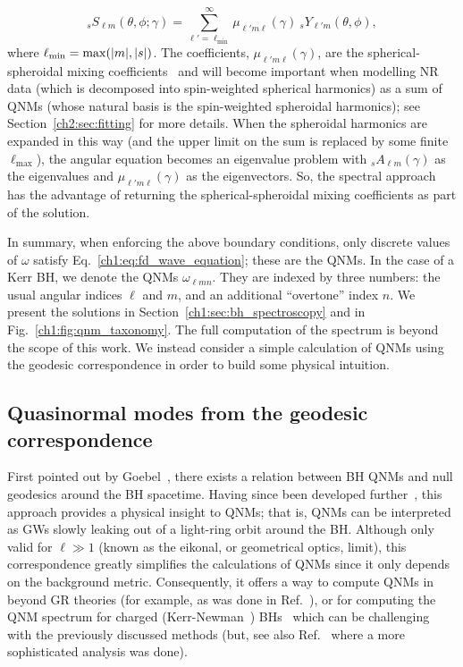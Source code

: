 \begin{equation}
    {}_{s}S_{\ell m}(\theta,\phi;\gamma) = \sum_{\ell'=\ell_\mathrm{min}}^\infty \mu_{\ell'm\ell}(\gamma) ~ {}_{s}Y_{\ell'm}(\theta,\phi),
\end{equation}
where $\ell_\mathrm{min} = \mathrm{max}(\abs{m},\abs{s})$.
The coefficients, $\mu_{\ell'm\ell}(\gamma)$, are the spherical-spheroidal mixing coefficients~\cite{Berti:2014fga} and will become important when modelling NR data (which is decomposed into spin-weighted spherical harmonics) as a sum of QNMs (whose natural basis is the spin-weighted spheroidal harmonics); see Section~\ref{ch2:sec:fitting} for more details.
When the spheroidal harmonics are expanded in this way (and the upper limit on the sum is replaced by some finite $\ell_\mathrm{max}$), the angular equation becomes an eigenvalue problem with ${}_{s}A_{\ell m}(\gamma)$ as the eigenvalues and $\mu_{\ell'm\ell}(\gamma)$ as the eigenvectors.
So, the spectral approach has the advantage of returning the spherical-spheroidal mixing coefficients as part of the solution.

In summary, when enforcing the above boundary conditions, only discrete values of $\omega$ satisfy Eq.~\ref{ch1:eq:fd_wave_equation}; these are the QNMs.
In the case of a Kerr BH, we denote the QNMs $\omega_{\ell m n}$.
They are indexed by three numbers: the usual angular indices $\ell$ and $m$, and an additional ``overtone'' index $n$.
We present the solutions in Section~\ref{ch1:sec:bh_spectroscopy} and in Fig.~\ref{ch1:fig:qnm_taxonomy}.
The full computation of the spectrum is beyond the scope of this work.
We instead consider a simple calculation of QNMs using the geodesic correspondence in order to build some physical intuition.

\subsection{Quasinormal modes from the geodesic correspondence}
\label{ch1:sec:geodesic}

First pointed out by Goebel~\cite{1972ApJ...172L..95G}, there exists a relation between BH QNMs and null geodesics around the BH spacetime.
Having since been developed further~\cite{BLOME1984231, Ferrari:1984ozr, Ferrari:1984zz, Cardoso:2008bp, Yang:2012he}, this approach provides a physical insight to QNMs; that is, QNMs can be interpreted as GWs slowly leaking out of a light-ring orbit around the BH. 
Although only valid for $\ell \gg 1$ (known as the eikonal, or geometrical optics, limit), this correspondence greatly simplifies the calculations of QNMs since it only depends on the background metric.
Consequently, it offers a way to compute QNMs in beyond GR theories (for example, as was done in Ref.~\cite{Blazquez-Salcedo:2016enn}), or for computing the QNM spectrum for charged (Kerr-Newman~\cite{Newman:1965my}) BHs~\cite{Cardoso:2016olt, Wang:2021uuh} which can be challenging with the previously discussed methods (but, see also Ref.~\cite{Carullo:2021oxn} where a more sophisticated analysis was done).

